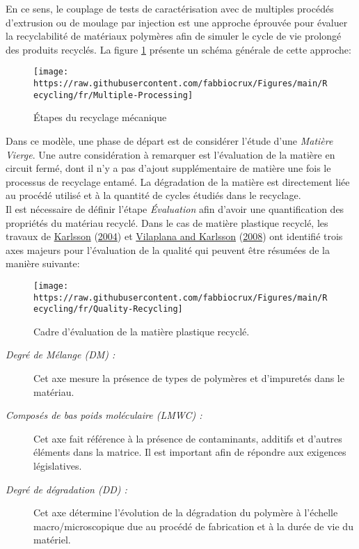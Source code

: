 \documentclass[
]{article}
\begin{document}
En ce sens, le couplage de tests de caractérisation avec de multiples procédés d'extrusion ou de moulage par injection est une approche éprouvée pour évaluer la recyclabilité de matériaux polymères afin de simuler le cycle de vie prolongé des produits recyclés. La figure \ref{fig:Mechanical-Recycling-Fr} présente un schéma générale de cette approche:

\begin{figure}

{\centering \texttt{[image: https://raw.githubusercontent.com/fabbiocrux/Figures/main/Recycling/fr/Multiple-Processing]} 

}

\caption{Étapes du recyclage mécanique}\label{fig:Mechanical-Recycling-Fr}
\end{figure}

Dans ce modèle, une phase de départ est de considérer l'étude d'une \emph{Matière Vierge}.
Une autre considération à remarquer est l'évaluation de la matière en circuit fermé, dont il n'y a pas d'ajout supplémentaire de matière une fois le processus de recyclage entamé.
La dégradation de la matière est directement liée au procédé utilisé et à la quantité de cycles étudiés dans le recyclage.\\
Il est nécessaire de définir l'étape \emph{Évaluation} afin d'avoir une quantification des propriétés du matériau recyclé.
Dans le cas de matière plastique recyclé, les travaux de \protect\hyperlink{ref-Karlsson2004}{Karlsson} (\protect\hyperlink{ref-Karlsson2004}{2004}) et \protect\hyperlink{ref-Vilaplana2008}{Vilaplana and Karlsson} (\protect\hyperlink{ref-Vilaplana2008}{2008}) ont identifié trois axes majeurs pour l'évaluation de la qualité qui peuvent être résumées de la manière suivante:

\begin{figure}

{\centering \texttt{[image: https://raw.githubusercontent.com/fabbiocrux/Figures/main/Recycling/fr/Quality-Recycling]} 

}

\caption{Cadre d'évaluation de la matière plastique recyclé.}\label{fig:Quality-Recycling-Fr}
\end{figure}

\begin{description}
\item[\emph{Degré de Mélange (DM) :}]
Cet axe mesure la présence de types de polymères et d'impuretés dans le matériau.
\item[\emph{Composés de bas poids moléculaire (LMWC) :}]
Cet axe fait référence à la présence de contaminants, additifs et d'autres éléments dans la matrice. Il est important afin de répondre aux exigences législatives.
\item[\emph{Degré de dégradation (DD) :}]
Cet axe détermine l'évolution de la dégradation du polymère à l'échelle macro/microscopique due au procédé de fabrication et à la durée de vie du matériel.
\end{description}
\end{document}

